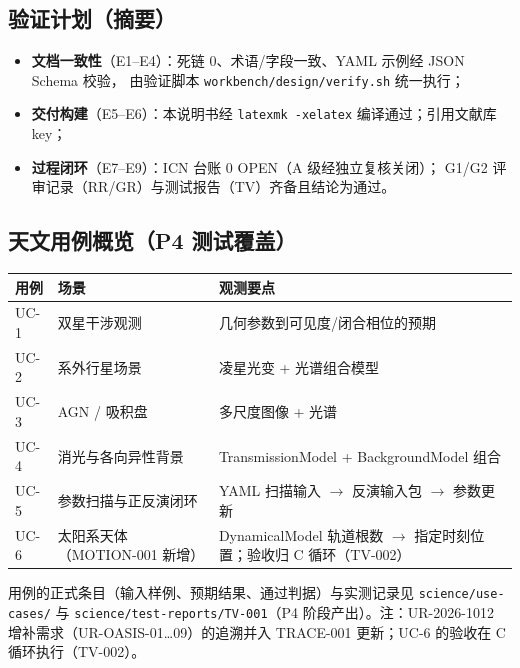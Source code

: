 \subsection{验证计划（摘要）}

\begin{itemize}
  \item \textbf{文档一致性}（E1--E4）：死链 0、术语/字段一致、YAML 示例经 JSON Schema 校验，
        由验证脚本 \texttt{workbench/design/verify.sh} 统一执行；
  \item \textbf{交付构建}（E5--E6）：本说明书经 \texttt{latexmk -xelatex} 编译通过；引用文献库 key；
  \item \textbf{过程闭环}（E7--E9）：ICN 台账 0 OPEN（A 级经独立复核关闭）；
        G1/G2 评审记录（RR/GR）与测试报告（TV）齐备且结论为通过。
\end{itemize}

\subsection{天文用例概览（P4 测试覆盖）}

\begin{center}
\begin{tabular}{lll}
\toprule
用例 & 场景 & 观测要点 \\
\midrule
UC-1 & 双星干涉观测 & 几何参数到可见度/闭合相位的预期 \\
UC-2 & 系外行星场景 & 凌星光变 + 光谱组合模型 \\
UC-3 & AGN / 吸积盘 & 多尺度图像 + 光谱 \\
UC-4 & 消光与各向异性背景 & TransmissionModel + BackgroundModel 组合 \\
UC-5 & 参数扫描与正反演闭环 & YAML 扫描输入 $\rightarrow$ 反演输入包 $\rightarrow$ 参数更新 \\
UC-6 & 太阳系天体（MOTION-001 新增） & DynamicalModel 轨道根数 $\rightarrow$ 指定时刻位置；验收归 C 循环（TV-002） \\
\bottomrule
\end{tabular}
\end{center}

用例的正式条目（输入样例、预期结果、通过判据）与实测记录见 \texttt{science/use-cases/} 与
\texttt{science/test-reports/TV-001}（P4 阶段产出）。注：UR-2026-1012 增补需求（UR-OASIS-01…09）的追溯并入
TRACE-001 更新；UC-6 的验收在 C 循环执行（TV-002）。

